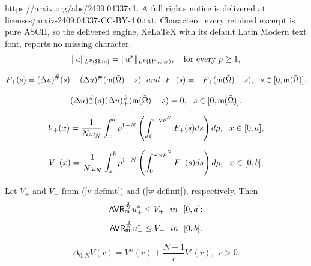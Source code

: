 \documentclass[10pt,a4paper]{amsart}
\begin{document}
https://arxiv.org/abs/2409.04337v1. A full rights notice is delivered at licenses/arxiv-2409.04337-CC-BY-4.0.txt. Characters: every retained excerpt is pure ASCII, so the delivered engine, XeLaTeX with its default Latin Modern text font, reports no missing character.
		\begin{equation}\label{equimeasure}
		\|u\|_{L^p(\Omega,{\sf m})}=\|u^*\|_{L^p(\Omega^*,\sigma_N)},  \quad \text{for every } p\geq 1,
	\end{equation} 

\begin{equation}\label{definition-F-pm}
	F_+(s)=(\Delta u)^\#_-(s)-(\Delta u)^\#_+({\sf m}(\tilde \Omega)-s)\ \ {\rm and}\ \ F_-(s)=-F_+({\sf m}(\tilde \Omega)-s),\ \ s\in [0,{\sf m}(\tilde \Omega)].
\end{equation}

\begin{equation}\label{simult=0}
	(\Delta u)^\#_-(s)(\Delta u)^\#_+({\sf m}(\tilde \Omega)-s)=0,\ \ s\in [0,{\sf m}(\tilde \Omega)].
\end{equation}

\begin{equation}\label{v-definit}
	V_+(x)=\frac{1}{N\omega_N}\int_{x}^a \rho^{1-N}\left(\int_0^{\omega_N \rho^N}F_+(s){\rm d}s\right){\rm d}\rho,\ \ x\in [0,a],
	\end{equation}

	\begin{equation}\label{w-definit}
		V_-(x)=\frac{1}{N\omega_N}\int_{x}^b \rho^{1-N}\left(\int_0^{\omega_N \rho^N}F_-(s){\rm d}s\right){\rm d}\rho,\ \ x\in [0,b],
				\end{equation}

		\begin{proposition} \label{talenti-result-0}
			Let  $V_+$ and $V_-$ from {\rm (\ref{v-definit})} and {\rm (\ref{w-definit})}, respectively. Then
			\begin{equation}\label{1-compar-0}
				{\sf AVR}_ {\sf m}^\frac{2}{N}	u_+^*\leq V_+\ \ {in}\ \ [0,a];
			\end{equation}
			\begin{equation}\label{2-compar-0}
				{\sf AVR}_ {\sf m}^\frac{2}{N}	u_-^*\leq V_-\ \ {in}\ \ [0,b].
			\end{equation}
		\end{proposition}

		\begin{equation}\label{def-1-laplace}
			\Delta_{0,N} V(r)=V''(r)+\frac{N-1}{r}V'(r),\ \ r>0.
		\end{equation}
\end{document}
